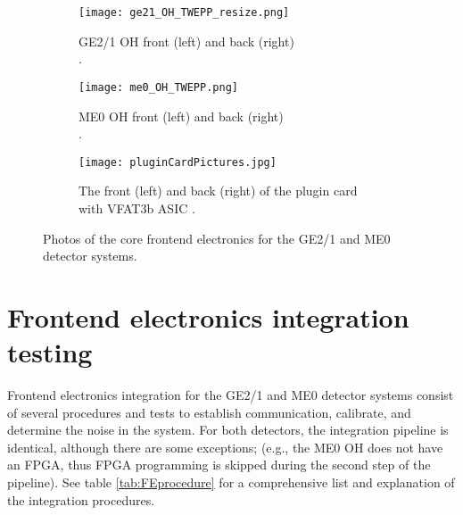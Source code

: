 \documentclass[a4paper,11pt]{article}
\begin{document}
\begin{figure}[!htp]
     \centering
     \begin{subfigure}[t]{0.3\textwidth}
         \centering
         \texttt{[image: ge21\_OH\_TWEPP\_resize.png]}
         \caption{\label{fig:ge21-OH}GE2/1 OH front (left) and back (right) \cite{OH}.~~~~~~~~~~~~~~~~~~~~~~~~~~~~~~~}
     \end{subfigure}
     \begin{subfigure}[t]{0.3\textwidth}
         \centering
         \texttt{[image: me0\_OH\_TWEPP.png]}
         \caption{\label{fig:me0-OH}ME0 OH front (left) and back (right) \cite{ASIAGO}.~~~~~~~~~~~~~~~~~~~~~~~~~~~~~~~~~~~~~}
         
     \end{subfigure}
     \begin{subfigure}[t]{0.3\textwidth}
         \centering
         \texttt{[image: pluginCardPictures.jpg]}
         \caption{\label{fig:pluginCards}The front (left) and back (right) of the plugin card with VFAT3b ASIC \cite{pluginCard}.}
         
     \end{subfigure}
        \caption{\label{fig:electronics}Photos of the core frontend electronics for the GE2/1 and ME0 detector systems.}
        
\end{figure}
\section{Frontend electronics integration testing}\label{sec:integration}
Frontend electronics integration for the GE2/1 and ME0 detector systems consist of several procedures and tests to establish communication, calibrate, and determine the noise in the system. For both detectors, the integration pipeline is identical, although there are some exceptions; (e.g., the ME0 OH does not have an FPGA, thus FPGA programming is skipped during the second step of the pipeline). See table \ref{tab:FEprocedure} for a comprehensive list and explanation of the integration procedures.
\end{document}

